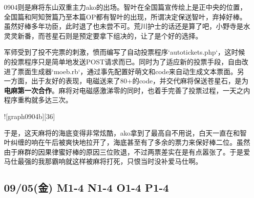 0904则是麻将东山双重主力ako的出场。智叶在全国篇宣传绘上是正中央的位置，全国篇和阿知贺篇乃至本篇OP都有智叶的出现，所谓决定保送智叶，弃掉好棒。虽然好棒多年功臣，此时退了也未尝不可。荒川护士的话还是算了吧，小野寺是水灵灵新番，而苍星石则是预定要拿下组决的，让了是个好的选择。

军师受到了投不完票的刺激，愤而编写了自动投票程序`autotickets.php`，这时候的投票程序只是简单地发送POST请求而已。同时为了适应新的投票手段，自由改进了票面生成器`moeb.rb`，通过事先配置好萌文和code来自动生成文本票面。另一方面，出于友好的表现，电磁送来了80+的code，并交代麻将保送苍星石，是为\textbf{电麻第一次合作}。麻将对电磁感激涕零的同时，也着手完善了投票过程，一天之内程序重构就多达三次。

![graph0904b][36]

于是，这天麻将的海底变得非常炫酷，ako拿到了最高自不用说，白天一直在和智叶纠缠的响在午后被爽快地拉开了，海底甚至有了多余的票力来保好棒二位。虽然由于麻群的因果律蜜好棒的原因三位败退，不过两票差实在是有点嚣张了。于是爱马仕最强的我那霸响就这样被麻将打死，只恨当时没补爱马仕啊。

\subsection{09/05(金) M1-4 N1-4 O1-4 P1-4}

